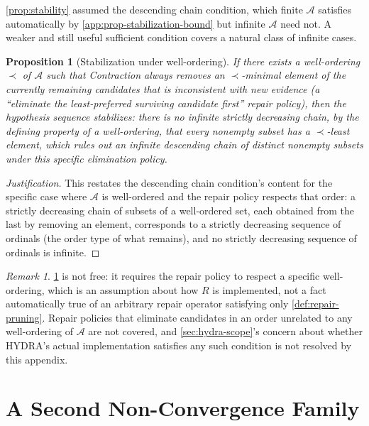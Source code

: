 \documentclass[11pt]{book}
\theoremstyle{plain}
\newtheorem{proposition}[theorem]{Proposition}
\theoremstyle{definition}
\theoremstyle{remark}
\newtheorem{remark}[theorem]{Remark}
\begin{document}
\cref{prop:stability} assumed the descending chain condition, which
finite $\mathcal{A}$ satisfies automatically by
\cref{app:prop-stabilization-bound} but infinite $\mathcal{A}$ need
not. A weaker and still useful sufficient condition covers a natural
class of infinite cases.

\begin{proposition}[Stabilization under well-ordering]
\label{app:prop-wellordering}
If there exists a well-ordering $\prec$ of $\mathcal{A}$ such that
Contraction always removes an $\prec$-minimal element of the currently
remaining candidates that is inconsistent with new evidence (a
\enquote{eliminate the least-preferred surviving candidate first}
repair policy), then the hypothesis sequence stabilizes: there is no
infinite strictly decreasing chain, by the defining property of a
well-ordering, that every nonempty subset has a $\prec$-least element,
which rules out an infinite descending chain of distinct nonempty
subsets under this specific elimination policy.
\end{proposition}

\begin{proof}[Justification]
This restates the descending chain condition's content for the
specific case where $\mathcal{A}$ is well-ordered and the repair
policy respects that order: a strictly decreasing chain of subsets of
a well-ordered set, each obtained from the last by removing an
element, corresponds to a strictly decreasing sequence of ordinals
(the order type of what remains), and no strictly decreasing sequence
of ordinals is infinite.
\end{proof}

\begin{remark}
\cref{app:prop-wellordering} is not free: it requires the repair
policy to respect a specific well-ordering, which is an assumption
about how $R$ is implemented, not a fact automatically true of an
arbitrary repair operator satisfying only
\cref{def:repair-pruning}. Repair policies that eliminate candidates
in an order unrelated to any well-ordering of $\mathcal{A}$ are not
covered, and \cref{sec:hydra-scope}'s concern about whether HYDRA's
actual implementation satisfies any such condition is not resolved by
this appendix.
\end{remark}

\section{A Second Non-Convergence Family}
\end{document}
